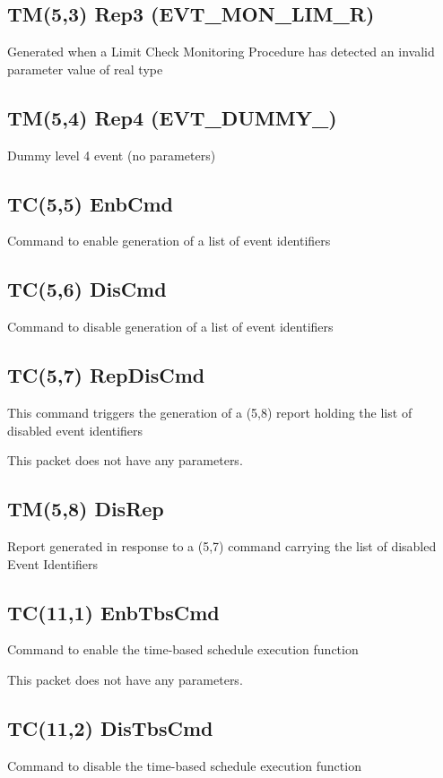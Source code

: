 \pagebreak
\subsection{TM(5,3) Rep3 (EVT\_\-MON\_\-LIM\_\-R)}
Generated when a Limit Check Monitoring Procedure has detected an invalid parameter value of real type

\pagebreak
\subsection{TM(5,4) Rep4 (EVT\_\-DUMMY\_)}
Dummy level 4 event (no parameters)

\pagebreak
\subsection{TC(5,5) EnbCmd}
Command to enable generation of a list of event identifiers

\pagebreak
\subsection{TC(5,6) DisCmd}
Command to disable generation of a list of event identifiers

\pagebreak
\subsection{TC(5,7) RepDisCmd}
This command triggers the generation of a (5,8) report holding the list of disabled event identifiers

This packet does not have any parameters.

\pagebreak
\subsection{TM(5,8) DisRep}
Report generated in response to a (5,7) command carrying the list of disabled Event Identifiers

\pagebreak
\subsection{TC(11,1) EnbTbsCmd}
Command to enable the time-based schedule execution function

This packet does not have any parameters.

\pagebreak
\subsection{TC(11,2) DisTbsCmd}
Command to disable the time-based schedule execution function

